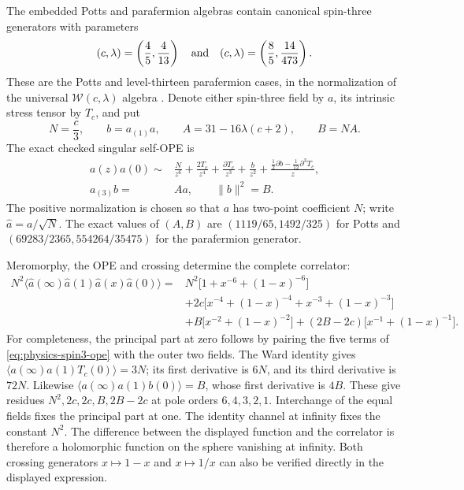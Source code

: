 \documentclass[11pt,a4paper]{article}
\theoremstyle{definition}
\begin{document}
The embedded Potts and parafermion algebras contain canonical spin-three generators with
parameters
\begin{equation}
 (c,\lambda)=\left(\frac45,\frac4{13}\right)
 \quad\hbox{and}\quad
 (c,\lambda)=\left(\frac85,\frac{14}{473}\right).
\end{equation}
These are the Potts and level-thirteen parafermion cases, in the
normalization of the universal $\mathcal W(c,\lambda)$ algebra
\cite{Linshaw,DLY}.  Denote either spin-three field by $a$, its intrinsic
stress tensor by $T_c$, and put
\begin{equation}
 N=\frac c3,\qquad b=a_{(1)}a,\qquad
 A=31-16\lambda(c+2),\qquad B=NA.
\end{equation}
The exact checked singular self-OPE is
\begin{align}
 a(z)a(0)\sim{}&\frac{N}{z^6}+\frac{2T_c}{z^4}
 +\frac{\partial T_c}{z^3}+\frac{b}{z^2}
 +\frac{\frac12\partial b-\frac1{12}\partial^3T_c}{z},
 \label{eq:physics-spin3-ope}\\
 a_{(3)}b={}&Aa,\qquad \|b\|^2=B.
\end{align}
The positive normalization is chosen so that $a$ has two-point
coefficient $N$; write $\widehat a=a/\sqrt N$.  The exact values of
$(A,B)$ are $(1119/65,1492/325)$ for Potts and
$(69283/2365,554264/35475)$ for the parafermion generator.

Meromorphy, the OPE and crossing determine the complete correlator:
\begin{align}
 N^2\langle\widehat a(\infty)\widehat a(1)
                 \widehat a(x)\widehat a(0)\rangle
 ={}&N^2\bigl[1+x^{-6}+(1-x)^{-6}\bigr]\nonumber\\
 &+2c\bigl[x^{-4}+(1-x)^{-4}
             +x^{-3}+(1-x)^{-3}\bigr]\nonumber\\
 &+B\bigl[x^{-2}+(1-x)^{-2}\bigr]
 +(2B-2c)\bigl[x^{-1}+(1-x)^{-1}\bigr].
 \label{eq:physics-spin3-fourpoint}
\end{align}
For completeness, the principal part at zero follows by pairing the
five terms of \eqref{eq:physics-spin3-ope} with the outer two fields.
The Ward identity gives
$\langle a(\infty)a(1)T_c(0)\rangle=3N$; its first derivative is
$6N$, and its third derivative is $72N$.  Likewise
$\langle a(\infty)a(1)b(0)\rangle=B$, whose first derivative is
$4B$.  These give residues $N^2,2c,2c,B,2B-2c$ at pole orders
$6,4,3,2,1$.  Interchange of the equal fields fixes the principal part
at one.  The identity channel at infinity fixes the constant $N^2$.
The difference between the displayed function and the correlator is
therefore a holomorphic function on the sphere vanishing at infinity.
Both crossing generators $x\mapsto1-x$ and $x\mapsto1/x$ can also be
verified directly in the displayed expression.
\end{document}
